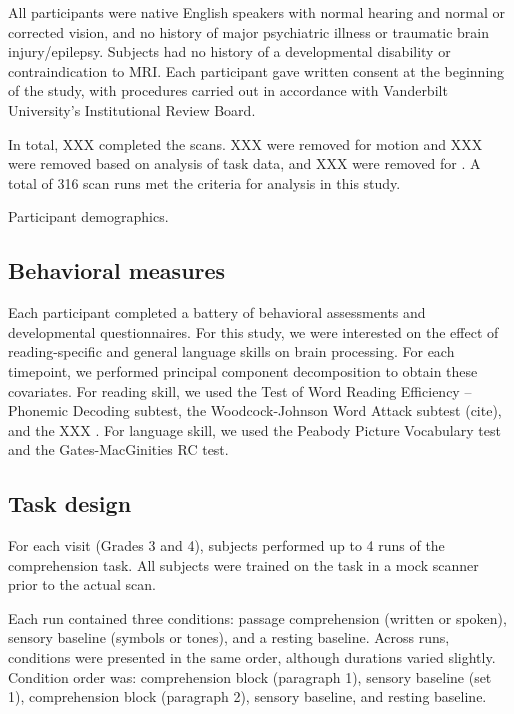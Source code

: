 All participants were native English speakers with normal hearing and normal or corrected vision, and no history of major psychiatric illness or traumatic brain injury/epilepsy. Subjects had no history of a developmental disability or contraindication to MRI.  Each participant gave written consent at the beginning of the study, with procedures carried out in accordance with Vanderbilt University’s Institutional Review Board.

In total, XXX completed the scans. XXX were removed for motion and XXX were removed based on analysis of task data, and XXX were removed for . A total of 316 scan runs met the criteria for analysis in this study.

\begin{table}
	\scriptsize
	\renewcommand{\tabcolsep}{0.09cm}
	\centering
	
	\caption{Participant demographics.}
	\label{table:Ch2_Participants}
\end{table}

\subsection{Behavioral measures}
Each participant completed a battery of behavioral assessments and developmental questionnaires. For this study, we were interested on the effect of reading-specific and general language skills on brain processing. For each timepoint, we performed principal component decomposition to obtain these covariates. For reading skill, we used the Test of Word Reading Efficiency – Phonemic Decoding subtest, the Woodcock-Johnson Word Attack subtest (cite), and the XXX . For language skill, we used the Peabody Picture Vocabulary test and the Gates-MacGinities RC test. 

\subsection{Task design}

For each visit (Grades 3 and 4), subjects performed up to 4 runs of the comprehension task. All subjects were trained on the task in a mock scanner prior to the actual scan. 

Each run contained three conditions: passage comprehension (written or spoken), sensory baseline (symbols or tones), and a resting baseline.  Across runs, conditions were presented in the same order, although durations varied slightly. Condition order was: comprehension block (paragraph 1), sensory baseline (set 1), comprehension block (paragraph 2), sensory baseline, and resting baseline. 

